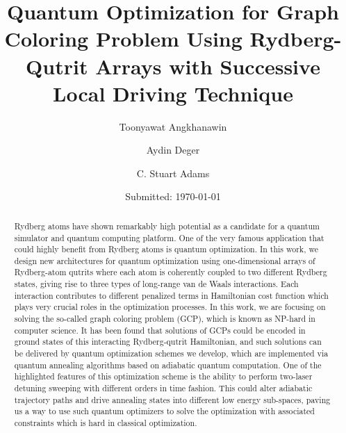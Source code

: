 \documentclass[%
 reprint,
nofootinbib,
 amsmath,amssymb,
 aps,
pra,
floatfix,
]{revtex4-2}
\begin{document}
\title{Quantum Optimization for Graph Coloring Problem Using Rydberg-Qutrit Arrays with Successive Local Driving Technique} 
\date{Submitted: \today{}}
\author{Toonyawat Angkhanawin}
\author{Aydin Deger}
\author{C. Stuart Adams}


\begin{abstract}
Rydberg atoms have shown remarkably high potential as a candidate for a quantum simulator and quantum computing platform. One of the very famous application that could highly benefit from Rydberg atoms is quantum optimization. In this work, we design new architectures for quantum optimization using one-dimensional arrays of Rydberg-atom qutrits where each atom is coherently coupled to two different Rydberg states, giving rise to three types of long-range van de Waals interactions. Each interaction contributes to different penalized terms in Hamiltonian cost function which plays very crucial roles in the optimization processes. In this work, we are focusing on solving the so-called graph coloring problem (GCP), which is known as NP-hard in computer science. It has been found that solutions of GCPs could be encoded in ground states of this interacting Rydberg-qutrit Hamiltonian, and such solutions can be delivered by quantum optimization schemes we develop, which are implemented via quantum annealing algorithms based on adiabatic quantum computation. One of the highlighted features of this optimization scheme is the ability to perform two-laser detuning sweeping with different orders in time fashion. This could alter adiabatic trajectory paths and drive annealing states into different low energy sub-spaces, paving us a way to use such quantum optimizers to solve the optimization with associated constraints which is hard in classical optimization.
\end{abstract}

\maketitle
\end{document}
